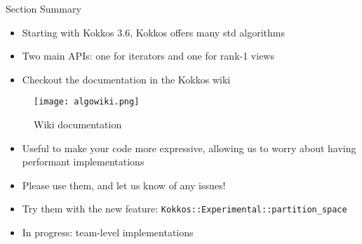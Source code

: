 \begin{frame}{Section Summary}

  \begin{minipage}{0.6\textwidth}
    \begin{itemize}
    \item Starting with Kokkos 3.6, Kokkos offers many std algorithms
    \item Two main APIs: one for iterators and one for rank-1 views
    \item Checkout the documentation in the Kokkos wiki
    \end{itemize}
  \end{minipage}
  \begin{minipage}{0.38\textwidth}
    \begin{figure}
      \texttt{[image: algowiki.png]}
      \caption{Wiki documentation}
    \end{figure}
  \end{minipage}

  \begin{itemize}
  \item{Useful to make your code more expressive, allowing us to worry about having performant implementations}
  \item{Please use them, and let us know of any issues!}
  \item{Try them with the new feature: \texttt{Kokkos::Experimental::partition\_space}}
  \item{In progress: team-level implementations}
  \end{itemize}

\end{frame}
